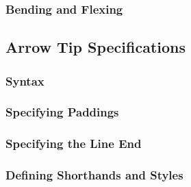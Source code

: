\subsubsection{Bending and Flexing}


\subsection{Arrow Tip Specifications}
\label{section-arrow-spec}

\subsubsection{Syntax}

\subsubsection{Specifying Paddings}

\subsubsection{Specifying the Line End}

\subsubsection{Defining Shorthands and Styles}

